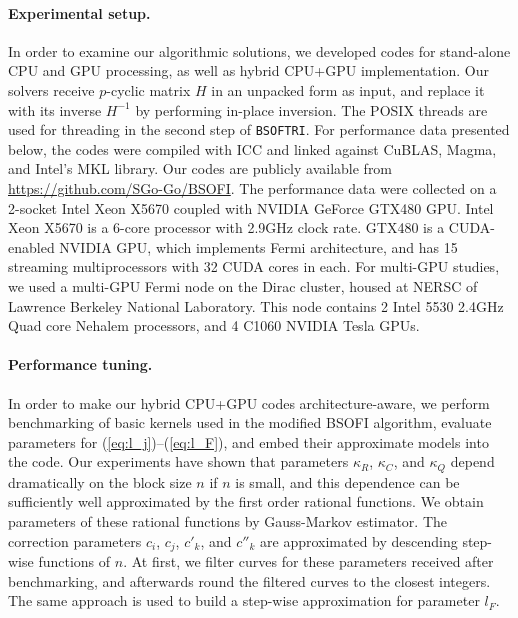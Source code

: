 \documentclass{llncs}
\newcommand{\Blas}{{\sc BLAS}\xspace}
\newcommand{\Cuda}{{\sc CUDA}\xspace}
\newcommand{\CuBlas}{{\sc Cu\Blas}\xspace}
\newcommand{\Magma}{{\sc Magma}\xspace}
\newcommand{\Bsoftri}{\texttt{BSOFTRI}\xspace}
\begin{document}
\paragraph{Experimental setup.}
\label{sec:experimental_setup}
%
In order to examine our algorithmic solutions, 
we developed codes for 
stand-alone CPU and GPU processing, 
as well as hybrid CPU+GPU implementation.
Our solvers receive $p$-cyclic matrix $H$ in an unpacked form as input, 
and replace it with its inverse $H^{-1}$ 
by performing in-place inversion. 
The POSIX threads are used for threading in the second step of \Bsoftri.
For performance data presented below, 
the codes were compiled with ICC
and linked against \CuBlas, \Magma, and Intel's MKL library.
Our codes are publicly available from
\url{https://github.com/SGo-Go/BSOFI}.
The performance data were collected on a 2-socket Intel Xeon X5670 
coupled with NVIDIA GeForce GTX480 GPU.
Intel Xeon X5670 is a 6-core processor with 2.9GHz clock rate.
GTX480 is a \Cuda-enabled NVIDIA GPU, 
which implements Fermi architecture, 
and has 15 streaming multiprocessors with 32 \Cuda cores in each.
For multi-GPU studies, we used a multi-GPU Fermi node on the Dirac cluster,
housed at NERSC of Lawrence Berkeley National Laboratory.
This node contains 2 Intel 5530 2.4GHz Quad core Nehalem processors, 
and 4 C1060 NVIDIA Tesla GPUs.

\paragraph{Performance tuning.}
\label{sec:BB_performance}
%
In order to make our hybrid CPU+GPU codes architecture-aware, 
we perform benchmarking of basic kernels used in the modified BSOFI algorithm, 
evaluate parameters for (\ref{eq:l_j})--(\ref{eq:l_F}), 
and embed their approximate models into the code.
Our experiments have shown that 
parameters $\kappa_R$, $\kappa_C$, and $\kappa_Q$ 
depend dramatically on the block size $n$ if $n$ is small, and
this dependence can be sufficiently well
approximated by the first order rational functions. 
We obtain parameters of these rational functions 
by Gauss-Markov estimator. 
The correction parameters $c_i$, $c_j$, $c'_k$, and $c''_k$
are approximated by descending step-wise functions of $n$.
At first, we filter curves for these parameters received after benchmarking, 
and afterwards round the filtered curves to the closest integers.
The same approach is used to build a step-wise approximation for parameter $l_F$.
\end{document}
